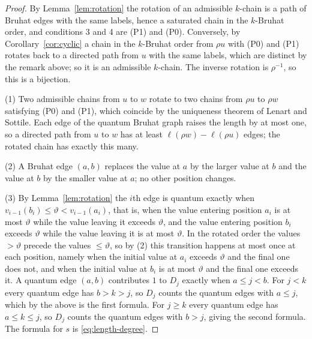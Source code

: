 \documentclass[11pt]{article}
\newcommand{\ellength}{\ell}
\begin{document}
\begin{proof}
By Lemma~\ref{lem:rotation} the rotation of an admissible $k$-chain
is a path of Bruhat edges with the same labels, hence a saturated
chain in the $k$-Bruhat order, and conditions 3 and 4 are (P1) and
(P0). Conversely, by Corollary~\ref{cor:cyclic} a chain in the
$k$-Bruhat order from $\rho u$ with (P0) and (P1) rotates back to a
directed path from $u$ with the same labels, which are distinct by the
remark above; so it is an admissible $k$-chain. The inverse rotation
is $\rho^{-1}$, so this is a bijection.

(1) Two admissible chains from $u$ to $w$ rotate to two chains from
$\rho u$ to $\rho w$ satisfying (P0) and (P1), which coincide by the
uniqueness theorem of Lenart and Sottile. Each edge of the quantum
Bruhat graph raises the length by at most one, so a directed path from
$u$ to $w$ has at least $\ellength(\rho w)-\ellength(\rho u)$ edges;
the rotated chain has exactly this many.

(2) A Bruhat edge $(a,b)$ replaces the value at $a$ by the larger
value at $b$ and the value at $b$ by the smaller value at $a$; no
other position changes.

(3) By Lemma~\ref{lem:rotation} the $i$th edge is quantum exactly
when $v_{i-1}(b_i)\leq\vartheta<v_{i-1}(a_i)$, that is, when the value
entering position $a_i$ is at most $\vartheta$ while the value leaving
it exceeds $\vartheta$, and the value entering position $b_i$ exceeds
$\vartheta$ while the value leaving it is at most $\vartheta$. In the
rotated order the values $>\vartheta$ precede the values
$\leq\vartheta$, so by (2) this transition happens at most once at
each position, namely when the initial value at $a_i$ exceeds
$\vartheta$ and the final one does not, and when the initial value at
$b_i$ is at most $\vartheta$ and the final one exceeds it. A quantum
edge $(a,b)$ contributes $1$ to $D_j$ exactly when $a\leq j<b$. For
$j<k$ every quantum edge has $b>k>j$, so $D_j$ counts the quantum
edges with $a\leq j$, which by the above is the first formula. For
$j\geq k$ every quantum edge has $a\leq k\leq j$, so $D_j$ counts the
quantum edges with $b>j$, giving the second formula. The formula for
$s$ is \eqref{eq:length-degree}.
\end{proof}
\end{document}
